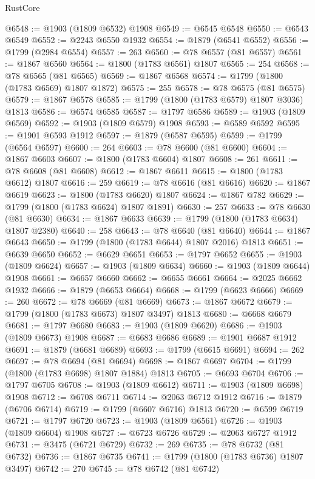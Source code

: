 \begin{lexlean}{RustCore}
\begin{coremodule}
@6548 := @1903 (@1809 @6532) @1908
@6549 := @6545 @6548
@6550 := @6543 @6549
@6552 := @2243 @6550 @1932
@6554 := @1879 (@6541 @6552)
@6556 := @1799 (@2984 @6554)
@6557 := 263
@6560 := @78 @6557 (@81 @6557)
@6561 := @1867 @6560
@6564 := @1800 (@1783 @6561) @1807
@6565 := 254
@6568 := @78 @6565 (@81 @6565)
@6569 := @1867 @6568
@6574 := @1799 (@1800 (@1783 @6569) @1807 @1872)
@6575 := 255
@6578 := @78 @6575 (@81 @6575)
@6579 := @1867 @6578
@6585 := @1799 (@1800 (@1783 @6579) @1807 @3036) @1813
@6586 := @6574 @6585
@6587 := @1797 @6586
@6589 := @1903 (@1809 @6569)
@6592 := @1903 (@1809 @6579) @1908
@6593 := @6589 @6592
@6595 := @1901 @6593 @1912
@6597 := @1879 (@6587 @6595)
@6599 := @1799 (@6564 @6597)
@6600 := 264
@6603 := @78 @6600 (@81 @6600)
@6604 := @1867 @6603
@6607 := @1800 (@1783 @6604) @1807
@6608 := 261
@6611 := @78 @6608 (@81 @6608)
@6612 := @1867 @6611
@6615 := @1800 (@1783 @6612) @1807
@6616 := 259
@6619 := @78 @6616 (@81 @6616)
@6620 := @1867 @6619
@6623 := @1800 (@1783 @6620) @1807
@6624 := @1867 @782
@6629 := @1799 (@1800 (@1783 @6624) @1807 @1891)
@6630 := 257
@6633 := @78 @6630 (@81 @6630)
@6634 := @1867 @6633
@6639 := @1799 (@1800 (@1783 @6634) @1807 @2380)
@6640 := 258
@6643 := @78 @6640 (@81 @6640)
@6644 := @1867 @6643
@6650 := @1799 (@1800 (@1783 @6644) @1807 @2016) @1813
@6651 := @6639 @6650
@6652 := @6629 @6651
@6653 := @1797 @6652
@6655 := @1903 (@1809 @6624)
@6657 := @1903 (@1809 @6634)
@6660 := @1903 (@1809 @6644) @1908
@6661 := @6657 @6660
@6662 := @6655 @6661
@6664 := @2025 @6662 @1932
@6666 := @1879 (@6653 @6664)
@6668 := @1799 (@6623 @6666)
@6669 := 260
@6672 := @78 @6669 (@81 @6669)
@6673 := @1867 @6672
@6679 := @1799 (@1800 (@1783 @6673) @1807 @3497) @1813
@6680 := @6668 @6679
@6681 := @1797 @6680
@6683 := @1903 (@1809 @6620)
@6686 := @1903 (@1809 @6673) @1908
@6687 := @6683 @6686
@6689 := @1901 @6687 @1912
@6691 := @1879 (@6681 @6689)
@6693 := @1799 (@6615 @6691)
@6694 := 262
@6697 := @78 @6694 (@81 @6694)
@6698 := @1867 @6697
@6704 := @1799 (@1800 (@1783 @6698) @1807 @1884) @1813
@6705 := @6693 @6704
@6706 := @1797 @6705
@6708 := @1903 (@1809 @6612)
@6711 := @1903 (@1809 @6698) @1908
@6712 := @6708 @6711
@6714 := @2063 @6712 @1912
@6716 := @1879 (@6706 @6714)
@6719 := @1799 (@6607 @6716) @1813
@6720 := @6599 @6719
@6721 := @1797 @6720
@6723 := @1903 (@1809 @6561)
@6726 := @1903 (@1809 @6604) @1908
@6727 := @6723 @6726
@6729 := @2063 @6727 @1912
@6731 := @3475 (@6721 @6729)
@6732 := 269
@6735 := @78 @6732 (@81 @6732)
@6736 := @1867 @6735
@6741 := @1799 (@1800 (@1783 @6736) @1807 @3497)
@6742 := 270
@6745 := @78 @6742 (@81 @6742)

\end{coremodule}
\end{lexlean}
